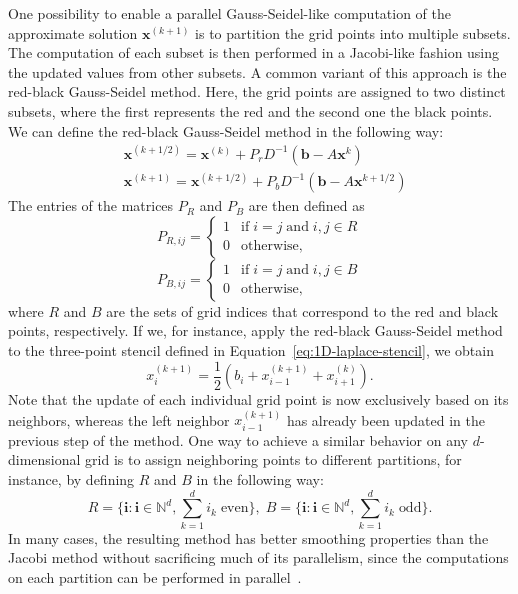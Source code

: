 One possibility to enable a parallel Gauss-Seidel-like computation of the approximate solution $\bm{x}^{(k+1)}$ is to partition the grid points into multiple subsets.
The computation of each subset is then performed in a Jacobi-like fashion using the updated values from other subsets.
A common variant of this approach is the red-black Gauss-Seidel method.
Here, the grid points are assigned to two distinct subsets, where the first represents the red and the second one the black points.
We can define the red-black Gauss-Seidel method in the following way:
\begin{equation}
	\begin{split}
		& \bm{x}^{(k+1/2)} = \bm{x}^{(k)} + P_r D^{-1} (\bm{b} - A \bm{x}^{k}) \\
		& \bm{x}^{(k+1)} = \bm{x}^{(k+1/2)} + P_b D^{-1} (\bm{b} - A \bm{x}^{k+1/2})
	\end{split}
\end{equation}
The entries of the matrices $P_R$ and $P_B$ are then defined as
\begin{equation*}
	P_{R,ij} = \begin{cases}
	1 & \text{if} \; i = j \; \text{and} \; i,j \in R \\
	0 & \text{otherwise},  
	\end{cases}
\end{equation*}
\begin{equation*}
	P_{B,ij} = \begin{cases}
		1 & \text{if} \; i = j \; \text{and} \; i,j \in B \\
		0 & \text{otherwise},
	\end{cases}
\end{equation*}
where $R$ and $B$ are the sets of grid indices that correspond to the red and black points, respectively.
If we, for instance, apply the red-black Gauss-Seidel method to the three-point stencil defined in Equation~\eqref{eq:1D-laplace-stencil}, we obtain
\begin{equation*}
	x_{i}^{(k+1)}=\frac {1}{2}\left(b_{i} + x_{i-1}^{(k+1)} + x_{i+1}^{(k)}\right).
\end{equation*}
Note that the update of each individual grid point is now exclusively based on its neighbors, whereas the left neighbor $x_{i-1}^{(k+1)}$ has already been updated in the previous step of the method.
One way to achieve a similar behavior on any $d$-dimensional grid is to assign neighboring points to different partitions, for instance, by defining $R$ and $B$ in the following way:
\begin{equation}
		R = \{ \bm{i} : \bm{i} \in \mathbb{N}^d, \sum_{k=1}^d i_k \; \text{even} \}, \;
		B = \{ \bm{i} : \bm{i} \in \mathbb{N}^d, \sum_{k=1}^d i_k \; \text{odd} \}.
\end{equation}
In many cases, the resulting method has better smoothing properties than the Jacobi method without sacrificing much of its parallelism, since the computations on each partition can be performed in parallel~\cite{trottenberg2000multigrid}.
